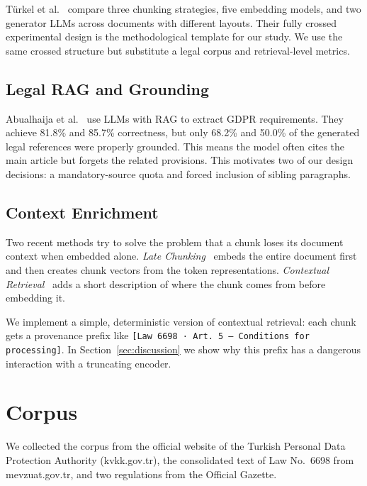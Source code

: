 \documentclass[11pt,a4paper,twocolumn]{article}
\begin{document}
Türkel et al.~\cite{turkel2026} compare three chunking strategies, five embedding models, and two generator LLMs across documents with different layouts. Their fully crossed experimental design is the methodological template for our study. We use the same crossed structure but substitute a legal corpus and retrieval-level metrics.

\subsection{Legal RAG and Grounding}

Abualhaija et al.~\cite{abualhaija2025} use LLMs with RAG to extract GDPR requirements. They achieve 81.8\% and 85.7\% correctness, but only 68.2\% and 50.0\% of the generated legal references were properly grounded. This means the model often cites the main article but forgets the related provisions. This motivates two of our design decisions: a mandatory-source quota and forced inclusion of sibling paragraphs.

\subsection{Context Enrichment}

Two recent methods try to solve the problem that a chunk loses its document context when embedded alone. \textit{Late Chunking}~\cite{gunther2024} embeds the entire document first and then creates chunk vectors from the token representations. \textit{Contextual Retrieval}~\cite{anthropic2024} adds a short description of where the chunk comes from before embedding it.

We implement a simple, deterministic version of contextual retrieval: each chunk gets a provenance prefix like \texttt{[Law 6698 · Art.~5 --- Conditions for processing]}. In Section~\ref{sec:discussion} we show why this prefix has a dangerous interaction with a truncating encoder.


\section{Corpus}
\label{sec:corpus}

We collected the corpus from the official website of the Turkish Personal Data Protection Authority (kvkk.gov.tr), the consolidated text of Law No.~6698 from mevzuat.gov.tr, and two regulations from the Official Gazette.
\end{document}
